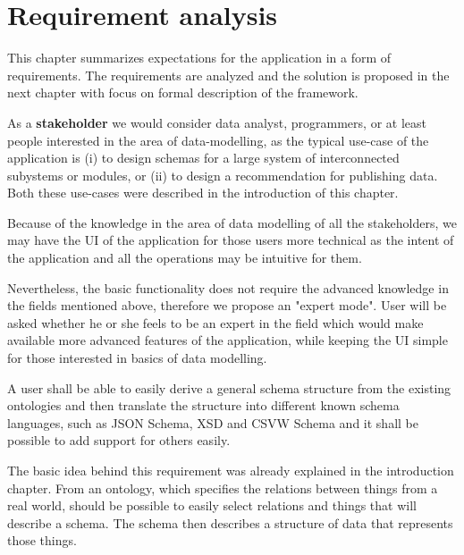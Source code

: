 \chapter{Requirement analysis}\label{chapters:analysis}

This chapter summarizes expectations for the application in a form of requirements. The requirements are analyzed and the solution is proposed in the next chapter with focus on formal description of the framework.

\bigskip


As a \textbf{stakeholder} we would consider data analyst, programmers, or at least people interested in the area of data-modelling, as the typical use-case of the application is (i) to design schemas for a large system of interconnected subystems or modules, or (ii) to design a recommendation for publishing data. Both these use-cases were described in the introduction of this chapter.

Because of the knowledge in the area of data modelling of all the stakeholders, we may have the UI of the application for those users more technical as the intent of the application and all the operations may be intuitive for them.

Nevertheless, the basic functionality does not require the advanced knowledge in the fields mentioned above, therefore we propose an "expert mode". User will be asked whether he or she feels to be an expert in the field which would make available more advanced features of the application, while keeping the UI simple for those interested in basics of data modelling.

\bigskip

\begin{requirement}
A user shall be able to easily derive a general schema structure from the existing ontologies and then translate the structure into different known schema languages, such as JSON Schema, XSD and CSVW Schema and it shall be possible to add support for others easily.
\end{requirement}

The basic idea behind this requirement was already explained in the introduction chapter. From an ontology, which specifies the relations between things from a real world, should be possible to easily select relations and things that will describe a schema. The schema then describes a structure of data that represents those things.

